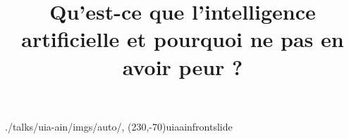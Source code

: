 

\title{Qu'est-ce que l'intelligence artificielle et pourquoi ne pas en avoir peur ?}


\usefootlinewithsections

\begin{graphicspathcontext}{{./talks/uia-ain/imgs/auto/},\old}
	\settitlepagerightfigure(230,-70){uiaainfrontslide}

\end{graphicspathcontext}

\usefootlinewithsections





\endinput
